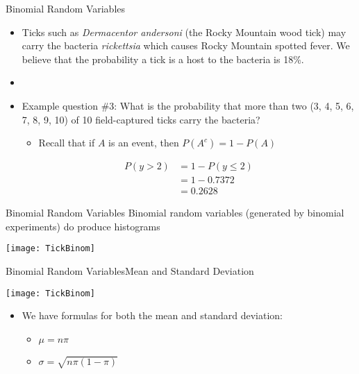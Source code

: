 \documentclass[xcolor=dvipsnames]{beamer}
\begin{document}
\begin{frame}{Binomial Random Variables}
	\begin{itemize}
		\item Ticks such as \emph{Dermacentor andersoni} (the Rocky Mountain wood tick) may carry the bacteria \emph{rickettsia} which causes Rocky Mountain spotted fever. We believe that the probability a tick is a host to the bacteria is 18\%. \pause
		\item[]
		\item Example question \#3: What is the probability that more than two (3, 4, 5, 6, 7, 8, 9, 10) of 10 field-captured ticks carry the bacteria? \pause
		\begin{itemize}
			\item Recall that if $A$ is an event, then $P(A^c) = 1- P(A)$
		\end{itemize} \pause
		\begin{align*}
			P(y > 2) &= 1 - P(y\leq 2) \\
			&= 1 - 0.7372 \\
			&= 0.2628
		\end{align*}
	\end{itemize}
\end{frame}

\begin{frame}{Binomial Random Variables}
	Binomial random variables (generated by binomial experiments) do produce histograms
	\begin{center}
		\texttt{[image: TickBinom]}
	\end{center}
\end{frame}

\begin{frame}{Binomial Random Variables}{Mean and Standard Deviation}
	\begin{center}
		\texttt{[image: TickBinom]}
	\end{center}
	\begin{itemize}
		\item We have formulas for both the mean and standard deviation:
		\begin{itemize}
			\item $\mu = n \pi$
			\item $\sigma = \sqrt{n \pi (1-\pi)}$
		\end{itemize}
	\end{itemize}
\end{frame}
\end{document}
